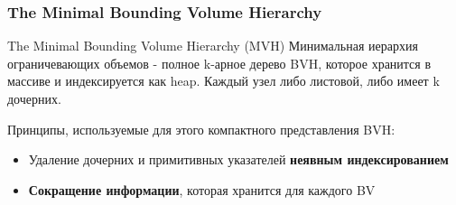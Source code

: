\begin{frame}[t]
    \frametitle{The Minimal Bounding Volume Hierarchy}
    \begin{block}{The Minimal Bounding Volume Hierarchy (MVH)}
        Минимальная иерархия ограничевающих объемов - полное k-арное дерево BVH, которое хранится в массиве
        и индексируется как heap.
        Каждый узел либо листовой, либо имеет k дочерних.
    \end{block}
    Принципы, используемые для этого компактного представления BVH:
    \begin{itemize}
        \item
            Удаление дочерних и примитивных указателей \textbf{неявным индексированием}
        \item
            \textbf{Сокращение информации}, которая хранится для каждого BV
    \end{itemize}

\end{frame}

